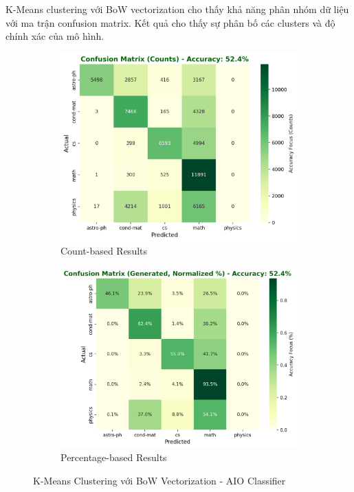 K-Means clustering với BoW vectorization cho thấy khả năng phân nhóm dữ liệu với ma trận confusion matrix. Kết quả cho thấy sự phân bố các clusters và độ chính xác của mô hình.

\begin{figure}[H]
\centering
\begin{subfigure}{0.48\textwidth}
    \centering
    \includegraphics[width=\textwidth]{image/Kmean_bow_count.png}
    \caption{Count-based Results}
    \label{fig:kmeans_bow_count_improvements}
\end{subfigure}
\hfill
\begin{subfigure}{0.48\textwidth}
    \centering
    \includegraphics[width=\textwidth]{image/Kmean_bow_percent.png}
    \caption{Percentage-based Results}
    \label{fig:kmeans_bow_percent_improvements}
\end{subfigure}
\caption{K-Means Clustering với BoW Vectorization - AIO Classifier}
\label{fig:kmeans_bow_results_improvements}
\end{figure}

